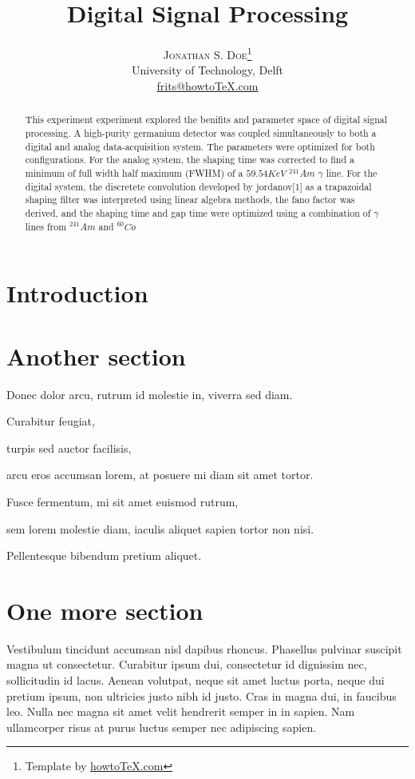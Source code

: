 \documentclass[twoside]{article}
\title{\vspace{-15mm}%
	\fontsize{24pt}{10pt}\selectfont
	\textbf{Digital Signal Processing}
	}
\author{%
	\large
	\textsc{Jonathan S. Doe}\thanks{Template by \href{http://www.howtotex.com}{howtoTeX.com}} \\[2mm]
	\normalsize	University of Technology, Delft \\
	\normalsize	\href{mailto:frits@howtoTeX.com}{frits@howtoTeX.com}
	\vspace{-5mm}
	}
\date{}
\begin{document}
\maketitle
\thispagestyle{fancy}

\begin{abstract}
\noindent This experiment experiment explored the benifits and parameter space of digital signal processing. A high-purity germanium detector was coupled simultaneously to both a digital and analog data-acquisition system. The parameters were optimized for both configurations. For the analog system, the shaping time was corrected to find a minimum of full width half maximum (FWHM) of a $59.54 KeV$ $^{241}Am$ $\gamma$ line. For the digital system, the discretete convolution developed by jordanov[1] as a trapazoidal shaping filter was interpreted using linear algebra methods, the fano factor was derived, and the shaping time and gap time were optimized using a combination of $\gamma$ lines from  $^{241}Am$ and $^{60}Co$
\end{abstract}
	

\begin{multicols}{2}

\section{Introduction}


\section{Another section}
\begin{compactitem}
\item Donec dolor arcu, rutrum id molestie in, viverra sed diam.
\item Curabitur feugiat, 
\item turpis sed auctor facilisis, 
\item arcu eros accumsan lorem, at posuere mi diam sit amet tortor. 
\item Fusce fermentum, mi sit amet euismod rutrum, 
\item sem lorem molestie diam, iaculis aliquet sapien tortor non nisi. \item Pellentesque bibendum pretium aliquet. 
\end{compactitem}

\section{One more section}
Vestibulum tincidunt accumsan nisl dapibus rhoncus. Phasellus pulvinar suscipit magna ut consectetur. Curabitur ipsum dui, consectetur id dignissim nec, sollicitudin id lacus. Aenean volutpat, neque sit amet luctus porta, neque dui pretium ipsum, non ultricies justo nibh id justo. Cras in magna dui, in faucibus leo. Nulla nec magna sit amet velit hendrerit semper in in sapien. Nam ullamcorper risus at purus luctus semper nec adipiscing sapien.

\end{multicols}
\end{document}
